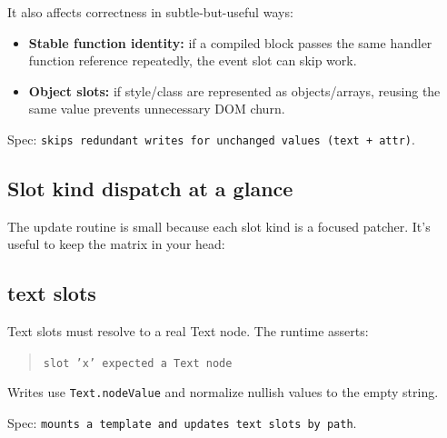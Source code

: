 It also affects correctness in subtle-but-useful ways:

\begin{itemize}
  \item \textbf{Stable function identity:} if a compiled block passes the same handler function reference repeatedly, the event slot can skip work.
  \item \textbf{Object slots:} if style/class are represented as objects/arrays, reusing the same value prevents unnecessary DOM churn.
\end{itemize}

Spec: \texttt{skips redundant writes for unchanged values (text + attr)}.

\subsection{Slot kind dispatch at a glance}

The update routine is small because each slot kind is a focused patcher. It’s useful to keep the matrix in your head:

\begin{center}
\end{center}

\subsection{text slots}

Text slots must resolve to a real Text node. The runtime asserts:

\begin{quote}
\texttt{slot 'x' expected a Text node}
\end{quote}

Writes use \texttt{Text.nodeValue} and normalize nullish values to the empty string.

Spec: \texttt{mounts a template and updates text slots by path}.

